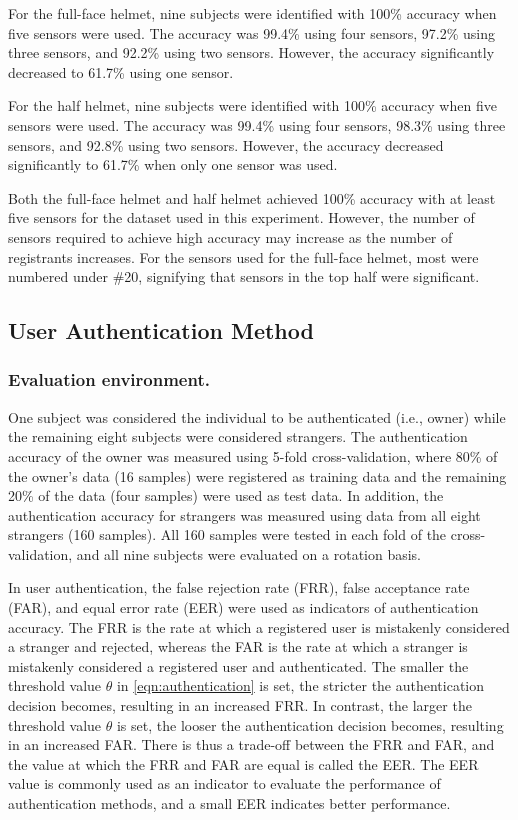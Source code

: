 \documentclass[english,preprint,JIP]{ipsj}
\begin{document}
For the full-face helmet, nine subjects were identified with 100\% accuracy when five sensors were used. The accuracy was 99.4\% using four sensors, 97.2\% using three sensors, and 92.2\% using two sensors. However, the accuracy significantly decreased to 61.7\% using one sensor.\par

For the half helmet, nine subjects were identified with 100\% accuracy when five sensors were used. The accuracy was 99.4\% using four sensors, 98.3\% using three sensors, and 92.8\% using two sensors. However, the accuracy decreased significantly to 61.7\% when only one sensor was used.\par

Both the full-face helmet and half helmet achieved 100\% accuracy with at least five sensors for the dataset used in this experiment. However, the number of sensors required to achieve high accuracy may increase as the number of registrants increases. For the sensors used for the full-face helmet, most were numbered under \#20, signifying that sensors in the top half were significant.


\subsection{User Authentication Method}


\subsubsection{Evaluation environment.}
One subject was considered the individual to be authenticated (i.e., owner) while the remaining eight subjects were considered strangers. The authentication accuracy of the owner was measured using 5-fold cross-validation, where 80\% of the owner's data (16 samples) were registered as training data and the remaining 20\% of the data (four samples) were used as test data. In addition, the authentication accuracy for strangers was measured using data from all eight strangers (160 samples). All 160 samples were tested in each fold of the cross-validation, and all nine subjects were evaluated on a rotation basis.\par

In user authentication, the false rejection rate (FRR), false acceptance rate (FAR), and equal error rate (EER) were used as indicators of authentication accuracy. The FRR is the rate at which a registered user is mistakenly considered a stranger and rejected, whereas the FAR is the rate at which a stranger is mistakenly considered a registered user and authenticated. The smaller the threshold value $\theta$ in \ref{eqn:authentication} is set, the stricter the authentication decision becomes, resulting in an increased FRR. In contrast, the larger the threshold value $\theta$ is set, the looser the authentication decision becomes, resulting in an increased FAR. There is thus a trade-off between the FRR and FAR, and the value at which the FRR and FAR are equal is called the EER. The EER value is commonly used as an indicator to evaluate the performance of authentication methods, and a small EER indicates better performance.
\end{document}
